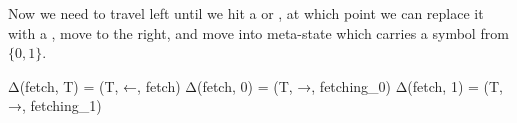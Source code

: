 Now we need to travel left until we hit a  or , at which point we can replace it with a , move to the right, and move into meta-state  which carries a symbol from $\{0, 1\}$.
\begin{stdout}
Δ(fetch, T) = (T, ←, fetch)
Δ(fetch, 0) = (T, →, fetching_0)
Δ(fetch, 1) = (T, →, fetching_1)
\end{stdout}
\begin{center}
\end{center}

